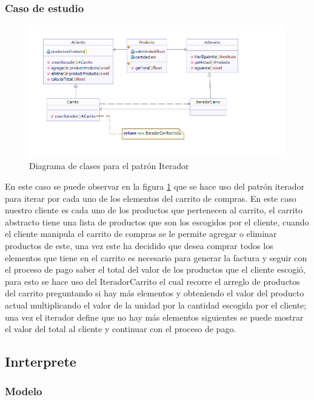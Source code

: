 \subsubsection{Caso de estudio}

\begin{figure}[th!]
	\centering
	\includegraphics[width=0.9\linewidth]{arquitectura/imagenes/DiagramaIterador}
	\caption{Diagrama de clases para el patrón Iterador}
	\label{fig:patronIterador}
\end{figure}

En este caso se puede observar en la figura \ref{fig:patronIterador} que se hace uso del patrón iterador para iterar por cada uno de los elementos del carrito de compras. En este caso nuestro cliente es cada uno de los productos que pertenecen al carrito, el carrito abstracto tiene una lista de productos que son los escogidos por el cliente, cuando el cliente manipula el carrito de compras se le permite agregar o eliminar productos de este, una vez este ha decidido que desea comprar todos los elementos que tiene en el carrito es necesario para generar la factura y seguir con el proceso de pago saber el total del valor de los productos que el cliente escogió, para esto se hace uso del IteradorCarrito  el cual recorre el arreglo de productos del carrito preguntando si hay más elementos y obteniendo el valor del producto actual multiplicando el valor de la unidad por la cantidad escogida por el cliente; una vez el iterador define que no hay más elementos siguientes se puede mostrar el valor del total al cliente y continuar con el proceso de pago.

\newpage

\subsection{Inrterprete}
\subsubsection{Modelo}
\newpage
